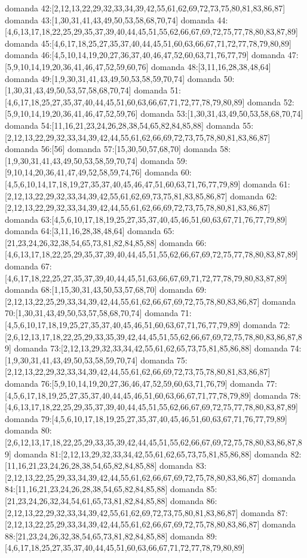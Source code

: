 domanda 42:[2,12,13,22,29,32,33,34,39,42,55,61,62,69,72,73,75,80,81,83,86,87]
domanda 43:[1,30,31,41,43,49,50,53,58,68,70,74]
domanda 44:[4,6,13,17,18,22,25,29,35,37,39,40,44,45,51,55,62,66,67,69,72,75,77,78,80,83,87,89]
domanda 45:[4,6,17,18,25,27,35,37,40,44,45,51,60,63,66,67,71,72,77,78,79,80,89]
domanda 46:[4,5,10,14,19,20,27,36,37,40,46,47,52,60,63,71,76,77,79]
domanda 47:[5,9,10,14,19,20,36,41,46,47,52,59,60,76]
domanda 48:[3,11,16,28,38,48,64]
domanda 49:[1,9,30,31,41,43,49,50,53,58,59,70,74]
domanda 50:[1,30,31,43,49,50,53,57,58,68,70,74]
domanda 51:[4,6,17,18,25,27,35,37,40,44,45,51,60,63,66,67,71,72,77,78,79,80,89]
domanda 52:[5,9,10,14,19,20,36,41,46,47,52,59,76]
domanda 53:[1,30,31,43,49,50,53,58,68,70,74]
domanda 54:[11,16,21,23,24,26,28,38,54,65,82,84,85,88]
domanda 55:[2,12,13,22,29,32,33,34,39,42,44,55,61,62,66,69,72,73,75,78,80,81,83,86,87]
domanda 56:[56]
domanda 57:[15,30,50,57,68,70]
domanda 58:[1,9,30,31,41,43,49,50,53,58,59,70,74]
domanda 59:[9,10,14,20,36,41,47,49,52,58,59,74,76]
domanda 60:[4,5,6,10,14,17,18,19,27,35,37,40,45,46,47,51,60,63,71,76,77,79,89]
domanda 61:[2,12,13,22,29,32,33,34,39,42,55,61,62,69,73,75,81,83,85,86,87]
domanda 62:[2,12,13,22,29,32,33,34,39,42,44,55,61,62,66,69,72,73,75,78,80,81,83,86,87]
domanda 63:[4,5,6,10,17,18,19,25,27,35,37,40,45,46,51,60,63,67,71,76,77,79,89]
domanda 64:[3,11,16,28,38,48,64]
domanda 65:[21,23,24,26,32,38,54,65,73,81,82,84,85,88]
domanda 66:[4,6,13,17,18,22,25,29,35,37,39,40,44,45,51,55,62,66,67,69,72,75,77,78,80,83,87,89]
domanda 67:[4,6,17,18,22,25,27,35,37,39,40,44,45,51,63,66,67,69,71,72,77,78,79,80,83,87,89]
domanda 68:[1,15,30,31,43,50,53,57,68,70]
domanda 69:[2,12,13,22,25,29,33,34,39,42,44,55,61,62,66,67,69,72,75,78,80,83,86,87]
domanda 70:[1,30,31,43,49,50,53,57,58,68,70,74]
domanda 71:[4,5,6,10,17,18,19,25,27,35,37,40,45,46,51,60,63,67,71,76,77,79,89]
domanda 72:[2,6,12,13,17,18,22,25,29,33,35,39,42,44,45,51,55,62,66,67,69,72,75,78,80,83,86,87,89]
domanda 73:[2,12,13,29,32,33,34,42,55,61,62,65,73,75,81,85,86,88]
domanda 74:[1,9,30,31,41,43,49,50,53,58,59,70,74]
domanda 75:[2,12,13,22,29,32,33,34,39,42,44,55,61,62,66,69,72,73,75,78,80,81,83,86,87]
domanda 76:[5,9,10,14,19,20,27,36,46,47,52,59,60,63,71,76,79]
domanda 77:[4,5,6,17,18,19,25,27,35,37,40,44,45,46,51,60,63,66,67,71,77,78,79,89]
domanda 78:[4,6,13,17,18,22,25,29,35,37,39,40,44,45,51,55,62,66,67,69,72,75,77,78,80,83,87,89]
domanda 79:[4,5,6,10,17,18,19,25,27,35,37,40,45,46,51,60,63,67,71,76,77,79,89]
domanda 80:[2,6,12,13,17,18,22,25,29,33,35,39,42,44,45,51,55,62,66,67,69,72,75,78,80,83,86,87,89]
domanda 81:[2,12,13,29,32,33,34,42,55,61,62,65,73,75,81,85,86,88]
domanda 82:[11,16,21,23,24,26,28,38,54,65,82,84,85,88]
domanda 83:[2,12,13,22,25,29,33,34,39,42,44,55,61,62,66,67,69,72,75,78,80,83,86,87]
domanda 84:[11,16,21,23,24,26,28,38,54,65,82,84,85,88]
domanda 85:[21,23,24,26,32,34,54,61,65,73,81,82,84,85,88]
domanda 86:[2,12,13,22,29,32,33,34,39,42,55,61,62,69,72,73,75,80,81,83,86,87]
domanda 87:[2,12,13,22,25,29,33,34,39,42,44,55,61,62,66,67,69,72,75,78,80,83,86,87]
domanda 88:[21,23,24,26,32,38,54,65,73,81,82,84,85,88]
domanda 89:[4,6,17,18,25,27,35,37,40,44,45,51,60,63,66,67,71,72,77,78,79,80,89]


